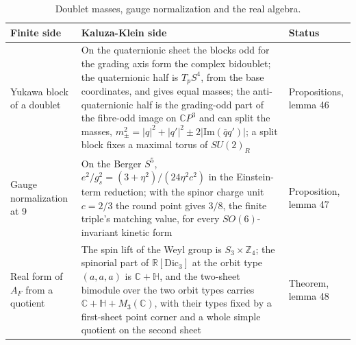 \documentclass[aps,prd,reprint,onecolumn,nofootinbib,amsmath,amssymb,floatfix]{revtex4-2}
\theoremstyle{plain}
\newcommand{\C}{\mathbb C}
\begin{document}
\begin{table}
\caption{\label{tab:normalization}Doublet masses, gauge normalization and the real algebra.}
\setlength{\tabcolsep}{0.01\textwidth}
\begin{ruledtabular}
\begin{tabular}{p{}p{}p{}}
Finite side&Kaluza-Klein side&Status\\
\hline
Yukawa block of a doublet&On the quaternionic sheet the blocks odd for the grading axis form the complex bidoublet; the quaternionic half is $T_pS^4$, from the base coordinates, and gives equal masses; the anti-quaternionic half is the grading-odd part of the fibre-odd image on $\C P^3$ and can split the masses, $m_\pm^2=|q|^2+|q'|^2\pm2|\mathrm{Im}(\bar q q')|$; a split block fixes a maximal torus of $SU(2)_R$&Propositions, lemma 46\\
Gauge normalization at 9&On the Berger $S^5$, $e^2/g_s^2=(3+\eta^2)/(24\eta^2c^2)$ in the Einstein-term reduction; with the spinor charge unit $c=2/3$ the round point gives $3/8$, the finite triple's matching value, for every $SO(6)$-invariant kinetic form&Proposition, lemma 47\\
Real form of $A_F$ from a quotient&The spin lift of the Weyl group is $S_3\times\mathbb Z_4$; the spinorial part of $\mathbb R[\mathrm{Dic}_3]$ at the orbit type $(a,a,a)$ is $\mathbb C+\mathbb H$, and the two-sheet bimodule over the two orbit types carries $\mathbb C+\mathbb H+M_3(\mathbb C)$, with their types fixed by a first-sheet point corner and a whole simple quotient on the second sheet&Theorem, lemma 48\\
\end{tabular}
\end{ruledtabular}
\end{table}
\end{document}
